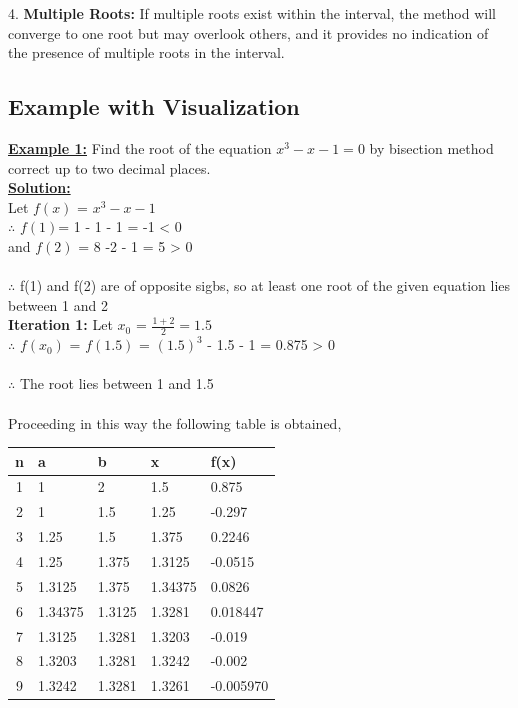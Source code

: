 \documentclass[12pt,a4paper]{article}
\begin{document}
	4. \textbf{Multiple Roots:} If multiple roots exist within the interval, the method will converge to one root but may overlook others, and it provides no indication of the presence of multiple roots in the interval.
	
	\subsection{Example with Visualization} 
	
	\textbf{\underline{Example 1:}} Find the root of the equation $x^3  - x -1 =0$ by bisection method correct up to two decimal places. \\
	
	\textbf{\underline{Solution:}}\\  Let \(f(x)\) = $x^3  - x -1$ \\
		$\therefore$ \(f(1)\)= 1 - 1 - 1 = -1 < 0 \\
		and \(f(2)\) = 8 -2 - 1 = 5 > 0 \\ \\
		$\therefore$ f(1) and f(2) are of opposite sigbs, so at least one root of the given equation lies between 1 and 2 \\
		
		\textbf{Iteration 1:} Let $x_0$ = $\frac{1+2}{2} = 1.5$ \\
		$\therefore$ \(f(x_0)\) = \(f(1.5)\) = $(1.5)^3$ - 1.5 - 1 = 0.875 > 0 \\ \\
		$\therefore$ The root lies between 1 and 1.5 \\ \\
		 Proceeding in this way the following table is obtained,\\
		
		
		\begin{tabularx}{\textwidth}{|c|X|X|X|X|}
			\hline
			n & a & b & x & f(x) \\
			\hline
			1 & 1 & 2 & 1.5 & 0.875 \\
			\hline
			2 & 1 & 1.5 & 1.25 & -0.297 \\
			\hline
			3 & 1.25 & 1.5 & 1.375 & 0.2246 \\
			\hline
			4 & 1.25 & 1.375 & 1.3125 & -0.0515 \\
			\hline
			5 & 1.3125 & 1.375 & 1.34375 & 0.0826 \\
			\hline
			6 & 1.34375 & 1.3125 & 1.3281 & 0.018447 \\
			\hline
			7 & 1.3125 & 1.3281 & 1.3203 & -0.019 \\
			\hline
			8 & 1.3203 & 1.3281 & 1.3242 & -0.002 \\
			\hline
			9 & 1.3242 & 1.3281 & 1.3261 & -0.005970 \\
			\hline
		\end{tabularx}
\end{document}
